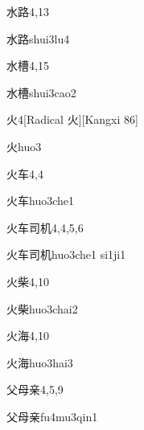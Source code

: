 \begin{entry}{水路}{4,13}
  \begin{phonetics}{水路}{shui3lu4}
  \end{phonetics}
\end{entry}

\begin{entry}{水槽}{4,15}
  \begin{phonetics}{水槽}{shui3cao2}
  \end{phonetics}
\end{entry}

\begin{entry}{火}{4}[Radical 火][Kangxi 86]
  \begin{phonetics}{火}{huo3}
  \end{phonetics}
\end{entry}

\begin{entry}{火车}{4,4}
  \begin{phonetics}{火车}{huo3che1}
  \end{phonetics}
\end{entry}

\begin{entry}{火车司机}{4,4,5,6}
  \begin{phonetics}{火车司机}{huo3che1 si1ji1}
  \end{phonetics}
\end{entry}

\begin{entry}{火柴}{4,10}
  \begin{phonetics}{火柴}{huo3chai2}
  \end{phonetics}
\end{entry}

\begin{entry}{火海}{4,10}
  \begin{phonetics}{火海}{huo3hai3}
  \end{phonetics}
\end{entry}

\begin{entry}{父母亲}{4,5,9}
  \begin{phonetics}{父母亲}{fu4mu3qin1}
  \end{phonetics}
\end{entry}

